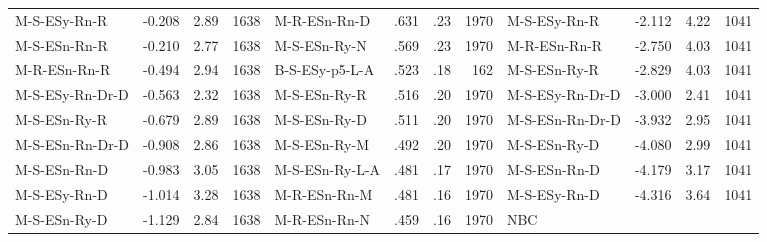 \documentclass[11pt,a4paper]{article}
\begin{document}
\begin{table}[]
\begin{tabular}[t]{lrrrlrrrlrrr}
        M-S-ESy-Rn-R & -0.208 & 2.89 & 1638 & M-R-ESn-Rn-D & .631 & .23 & 1970 & M-S-ESy-Rn-R & -2.112 & 4.22 & 1041  \\
        M-S-ESn-Rn-R & -0.210 & 2.77 & 1638 & M-S-ESn-Ry-N & .569 & .23 & 1970 & M-R-ESn-Rn-R & -2.750 & 4.03 & 1041  \\
        M-R-ESn-Rn-R & -0.494 & 2.94 & 1638 & B-S-ESy-p5-L-A & .523 & .18 & 162 & M-S-ESn-Ry-R & -2.829 & 4.03 & 1041  \\
        M-S-ESy-Rn-Dr-D & -0.563 & 2.32 & 1638 & M-S-ESn-Ry-R & .516 & .20 & 1970 & M-S-ESy-Rn-Dr-D & -3.000 & 2.41 & 1041  \\
        M-S-ESn-Ry-R & -0.679 & 2.89 & 1638 & M-S-ESn-Ry-D & .511 & .20 & 1970 & M-S-ESn-Rn-Dr-D & -3.932 & 2.95 & 1041  \\
        M-S-ESn-Rn-Dr-D & -0.908 & 2.86 & 1638 & M-S-ESn-Ry-M & .492 & .20 & 1970 & M-S-ESn-Ry-D & -4.080 & 2.99 & 1041  \\
        M-S-ESn-Rn-D & -0.983 & 3.05 & 1638 & M-S-ESn-Ry-L-A & .481 & .17 & 1970 & M-S-ESn-Rn-D & -4.179 & 3.17 & 1041  \\
        M-S-ESy-Rn-D & -1.014 & 3.28 & 1638 & M-R-ESn-Rn-M & .481 & .16 & 1970 & M-S-ESy-Rn-D & -4.316 & 3.64 & 1041  \\
        M-S-ESn-Ry-D & -1.129 & 2.84 & 1638 & M-R-ESn-Rn-N & .459 & .16 & 1970 & NBC &  &  &   \\
        \bottomrule
    \end{tabular}
\end{table}
    
\end{document}
